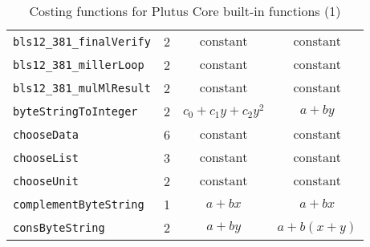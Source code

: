 \documentclass[a4paper]{article}
\newcommand\const{\ensuremath{\text{constant}}}
\newcommand\linX{\ensuremath{a+bx}}
\newcommand\linY{\ensuremath{a+by}}
\newcommand\linplusXY{\ensuremath{a+b(x+y)}}
\newcommand\quadr[1]{\ensuremath{c_{0} + c_{1}{#1} + c_{2}{#1}^2}}
\begin{document}
\begin{table}[H]
\begin{tabular}{|l|c|c|c|}
        \verb|bls12_381_finalVerify|           & 2 & \const & \const \\
        \verb|bls12_381_millerLoop|            & 2 & \const & \const \\
        \verb|bls12_381_mulMlResult|           & 2 & \const & \const \\
        \verb|byteStringToInteger|             & 2 & \quadr{y} & \linY \\
        \verb|chooseData|                      & 6 & \const & \const \\
        \verb|chooseList|                      & 3 & \const & \const \\
        \verb|chooseUnit|                      & 2 & \const & \const \\
        \verb|complementByteString|            & 1 & \linX & \linX \\
        \verb|consByteString|                  & 2 & \linY & \linplusXY \\
        \hline
    \end{tabular}
    \caption{Costing functions for Plutus Core built-in functions (1)}
    \label{table:costing-functions-1}
\end{table}
\end{document}

